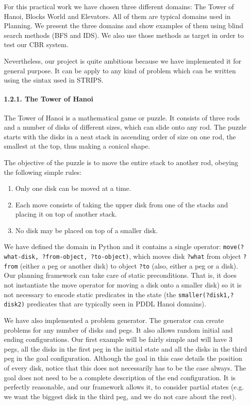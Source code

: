 \documentclass[11pt]{article}
\providecommand{\tightlist}{%
      \setlength{\itemsep}{0pt}\setlength{\parskip}{0pt}}
\begin{document}
For this practical work we have chosen three different domains: The
Tower of Hanoi, Blocks World and Elevators. All of them are typical
domains used in Planning. We present the three domains and show examples
of them using blind search methods (BFS and IDS). We also use those
methods as target in order to test our CBR system.

Nevertheless, our project is quite ambitious because we have implemented
it for general purpose. It can be apply to any kind of problem which can
be written using the sintax used in STRIPS.

\paragraph{1.2.1. The Tower of Hanoi}\label{the-tower-of-hanoi}

The Tower of Hanoi is a mathematical game or puzzle. It consists of
three rods and a number of disks of different sizes, which can slide
onto any rod. The puzzle starts with the disks in a neat stack in
ascending order of size on one rod, the smallest at the top, thus making
a conical shape.

The objective of the puzzle is to move the entire stack to another rod,
obeying the following simple rules:

\begin{enumerate}
\def\labelenumi{\arabic{enumi}.}
\tightlist
\item
  Only one disk can be moved at a time.
\item
  Each move consists of taking the upper disk from one of the stacks and
  placing it on top of another stack.
\item
  No disk may be placed on top of a smaller disk.
\end{enumerate}

We have defined the domain in Python and it contains a single operator:
\texttt{move(?what-disk,\ ?from-object,\ ?to-object)}, which moves disk
\texttt{?what} from object \texttt{?from} (either a peg or another disk)
to object \texttt{?to} (also, either a peg or a disk). Our planning
framework can take care of static preconditions. That is, it does not
instantiate the move operator for moving a disk onto a smaller disk) so
it is not necessary to encode static predicates in the state (the
\texttt{smaller(?disk1,?disk2)} predicates that are typically seen in
PDDL Hanoi domains).

We have also implemented a problem generator. The generator can create
problems for any number of disks and pegs. It also allows random initial
and ending configurations. Our first example will be fairly simple and
will have 3 pegs, all the disks in the first peg in the initial state
and all the disks in the third peg in the goal configuration. Although
the goal in this case details the position of every disk, notice that
this does not necessarily has to be the case always. The goal does not
need to be a complete description of the end configuration. It is
perfectly reasonable, and our framework allows it, to consider partial
states (e.g. we want the biggest disk in the third peg, and we do not
care about the rest).
\end{document}
